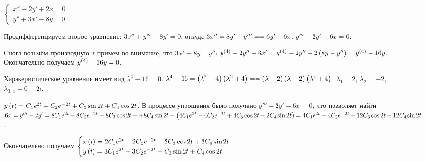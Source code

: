 \documentclass[a5paper,10pt]{article}
\begin{document}
$
\begin{cases}
    x'' - 2y' + 2x = 0 \\
    y'' + 3x' - 8y = 0
\end{cases}
$

Продифференцируем второе уравнение: $3x'' + y''' - 8y' = 0$, откуда $3x'' = 8y' - y''' = \linebreak = 6y' - 6x$. $y''' - 2y' - 6x = 0$. 

Снова возьмём производную и примем во внимание, что $3x' = 8y - y''$: $y^{\br{4}} - 2y'' - 6x' \linebreak = y^{\br{4}} - 2y'' - 2 \br{8y - y''} = y^{\br{4}} - 16y$. Окончательно получаем $y^{\left(4\right)} - 16y = 0$.

Харакеристическое уравнение имеет вид $\lambda^4 - 16 = 0$. $\lambda^4 - 16 = \br{\lambda^2 - 4} \br{\lambda^2 + 4} = \linebreak = \br{\lambda - 2} \br{\lambda + 2} \br{\lambda^2 + 4}$. $\lambda_{1} = 2$, $\lambda_{2} = -2$, $\lambda_{3, 4} = 0 \pm 2i$.

$y\left(t\right) = C_{1} e^{2t} + C_{2} e^{-2t} + C_{3} \sin 2t + C_{4} \cos 2t$. В процессе упрощения было получено $y''' - 2y' - 6x = 0$, что позволяет найти $6x = y''' - 2y' = 8C_{1}e^{2t} - 8C_2e^{-2t} - 8C_{3} \cos 2t + \linebreak + 8C_{4} \sin 2t - \br{4 C_{1} e^{2t} - 4 C_{2} e^{-2t} + 4 C_{3} \cos 2t - 2C_{4} \sin 2t} = 4 C_{1}e^{2t} - 4 C_2e^{-2t} - 12C_{3} \cos 2t \linebreak + 12C_{4} \sin 2t$.

Окончательно получаем
$
\begin{cases}
x\left(t\right) = 2 C_{1}e^{2t} - 2 C_2e^{-2t} - 2C_{3} \cos 2t + 2C_{4} \sin 2t \\
y\left(t\right) = 3 C_{1} e^{2t} + 3 C_{2} e^{-2t} + C_{3} \sin 2t + C_{4} \cos 2t 
\end{cases}
$
\end{document}
